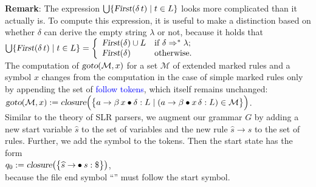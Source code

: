 \noindent
\textbf{Remark}: The expression $\bigcup\{\textsl{First}(\delta\,t)\mid{}t\in{}L\}$
looks more complicated than it actually is. To compute this expression,
it is useful to make a distinction based on whether $\delta$ can derive the empty
string $\lambda$ or not, because it holds that
\\[0.2cm]
\hspace*{1.3cm}
$\bigcup\{\textsl{First}(\delta\,t)\mid{}t\in{}L\} = 
\left\{
\begin{array}{ll}
  \textsl{First}(\delta) \cup L  & \mbox{if $\delta \Rightarrow^* \lambda$;}  \\
  \textsl{First}(\delta)         & \mbox{otherwise.}  
\end{array}
\right.
$
\\[0.2cm]
The computation of $\textsl{goto}(\mathcal{M},x)$ for a set $\mathcal{M}$ of extended marked rules and
a symbol $x$ changes from the computation in the case of simple marked rules
only by appending the set of \textcolor{blue}{follow tokens}, which itself remains unchanged:
\\[0.2cm]
\hspace*{1.3cm}
$\textsl{goto}(\mathcal{M}, x) := \textsl{closure}\Bigl( \bigl\{ 
   a \rightarrow \beta\, x \mdot \delta:L \mid (a \rightarrow \beta \mdot x\, \delta:L) \in \mathcal{M} 
   \bigr\} \Bigr)$. 
\\[0.2cm]
Similar to the theory of SLR parsers, we augment our grammar $G$ by adding
a new start variable $\widehat{s}$ to the set of variables and the
new rule $\widehat{s} \rightarrow s$ to the set of rules. Further, we add the symbol
 to the tokens. Then the start state has the form
\\[0.2cm]
\hspace*{1.3cm}
$q_0 := \textsl{closure}\bigl(\bigl\{ \widehat{s} \rightarrow \mdot s:\symbol{36}\bigr\}\bigr)$,
\\[0.2cm]
because the file end symbol ``'' must follow the start symbol.

